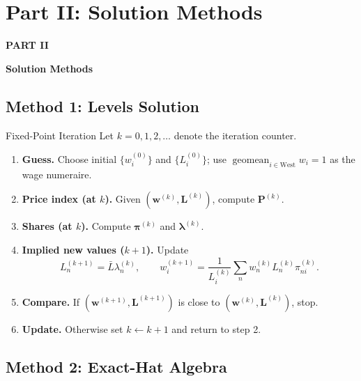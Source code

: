 \documentclass[aspectratio=169,11pt]{beamer}
\newcommand{\B}[1]{\textcolor{blue1}{\textbf{#1}}}
\newcommand{\partdivider}[2]{%
  \begin{frame}[plain]
    \vfill
    \begin{center}
      {\color{deepred}\Large\bfseries PART #1\par}
      \vspace{0.75em}
      {\color{oxfordblue}\LARGE\bfseries #2\par}
    \end{center}
    \vfill
  \end{frame}}
\begin{document}
\section{Part II: Solution Methods}

\partdivider{II}{Solution Methods}

\subsection{Method 1: Levels Solution}

\begin{frame}{Fixed-Point Iteration}
  \small
  Let \(k=0,1,2,\ldots\) denote the iteration counter.
  \begin{enumerate}\setlength{\itemsep}{5pt}
    \item \B{Guess.} Choose initial \(\{w_i^{(0)}\}\) and
      \(\{L_i^{(0)}\}\); use
      \(\operatorname{geomean}_{i\in\mathrm{West}}w_i=1\) as the wage
      numeraire.
    \item \B{Price index (at \(k\)).} Given \((\mathbf w^{(k)},\mathbf L^{(k)})\),
      compute \(\mathbf P^{(k)}\).
    \item \B{Shares (at \(k\)).} Compute \(\boldsymbol\pi^{(k)}\) and
      \(\boldsymbol\lambda^{(k)}\).
    \item \B{Implied new values (\(k+1\)).} Update
      \[
        L_n^{(k+1)}=\bar L\lambda_n^{(k)},
        \qquad
        w_i^{(k+1)}
        =\frac{1}{L_i^{(k)}}
          \sum_n w_n^{(k)}L_n^{(k)}\pi_{ni}^{(k)}.
      \]
    \item \B{Compare.} If \((\mathbf w^{(k+1)},\mathbf L^{(k+1)})\) is
      close to \((\mathbf w^{(k)},\mathbf L^{(k)})\), stop.
    \item \B{Update.} Otherwise set \(k\leftarrow k+1\) and return to step 2.
  \end{enumerate}
\end{frame}

\subsection{Method 2: Exact-Hat Algebra}
\end{document}
